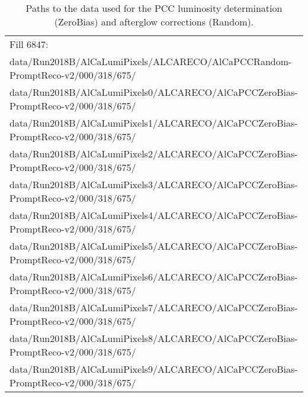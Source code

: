 \clearpage
\begin{table}[h]
  \caption{Paths to the data used for the PCC luminosity determination (ZeroBias) and afterglow corrections (Random).}
  \label{tab:datapaths}
  \footnotesize
  \begin{tabular}{l}
    \hline\hline
    Fill 6847:\\
data/Run2018B/AlCaLumiPixels/ALCARECO/AlCaPCCRandom-PromptReco-v2/000/318/675/\\ %
data/Run2018B/AlCaLumiPixels0/ALCARECO/AlCaPCCZeroBias-PromptReco-v2/000/318/675/\\ %
data/Run2018B/AlCaLumiPixels1/ALCARECO/AlCaPCCZeroBias-PromptReco-v2/000/318/675/\\ %
data/Run2018B/AlCaLumiPixels2/ALCARECO/AlCaPCCZeroBias-PromptReco-v2/000/318/675/\\ %
data/Run2018B/AlCaLumiPixels3/ALCARECO/AlCaPCCZeroBias-PromptReco-v2/000/318/675/\\ %
data/Run2018B/AlCaLumiPixels4/ALCARECO/AlCaPCCZeroBias-PromptReco-v2/000/318/675/\\ %
data/Run2018B/AlCaLumiPixels5/ALCARECO/AlCaPCCZeroBias-PromptReco-v2/000/318/675/\\ %
data/Run2018B/AlCaLumiPixels6/ALCARECO/AlCaPCCZeroBias-PromptReco-v2/000/318/675/\\ %
data/Run2018B/AlCaLumiPixels7/ALCARECO/AlCaPCCZeroBias-PromptReco-v2/000/318/675/\\ %
data/Run2018B/AlCaLumiPixels8/ALCARECO/AlCaPCCZeroBias-PromptReco-v2/000/318/675/\\ %
data/Run2018B/AlCaLumiPixels9/ALCARECO/AlCaPCCZeroBias-PromptReco-v2/000/318/675/\\ %

\end{tabular}
\end{table}
